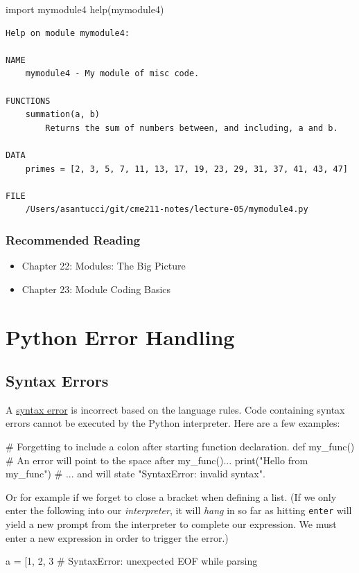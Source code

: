 \documentclass[12pt,letterpaper,twoside]{article}
\begin{document}
\begin{enumerate}
\begin{python}
import mymodule4
help(mymodule4)
\end{python}

\begin{verbatim}
Help on module mymodule4:

NAME
    mymodule4 - My module of misc code.

FUNCTIONS
    summation(a, b)
        Returns the sum of numbers between, and including, a and b.

DATA
    primes = [2, 3, 5, 7, 11, 13, 17, 19, 23, 29, 31, 37, 41, 43, 47]

FILE
    /Users/asantucci/git/cme211-notes/lecture-05/mymodule4.py
\end{verbatim}

\subsubsection{Recommended Reading}
\begin{itemize}
\item
  Chapter 22: Modules: The Big Picture
\item
  Chapter 23: Module Coding Basics
\end{itemize}



\section{Python Error Handling}

\subsection{Syntax Errors}

A \href{https://en.wikipedia.org/wiki/Syntax_error}{syntax error} 
is incorrect based on the language rules.
Code containing syntax errors cannot be executed by the Python interpreter.
Here are a few examples:

\begin{python}
# Forgetting to include a colon after starting function declaration.
def my_func()                   # An error will point to the space after my_func()...
  print("Hello from my_func")   # ... and will state "SyntaxError: invalid syntax".
\end{python}

Or for example if we forget to close a bracket when defining a list.
(If we only enter the following into our \emph{interpreter}, it will \emph{hang} in so far as hitting \texttt{enter} will yield a new prompt from the interpreter to complete our expression. We must enter a new expression in order to trigger the error.)
\begin{python}
a = [1, 2, 3            # SyntaxError: unexpected EOF while parsing
\end{python}


\end{enumerate}
\end{document}
